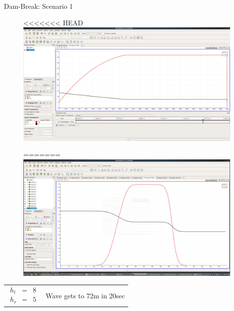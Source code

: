 \documentclass[shortpres]{beamer}
\newcommand{\imgvoffset}{-20pt}
\newcommand{\imgfullscale}{0.75}
\begin{document}
\begin{frame}{Dam-Break: Scenario 1}
	\begin{figure}[t]
		\vspace{\imgvoffset}
<<<<<<< HEAD
		\includegraphics[width=\imgfullscale\linewidth]{img/4_dorf_arrival_as_graph.png}
		\caption*{Scenario visualisation}
=======
		\includegraphics[width=\imgfullscale\linewidth]{img/Dam_hl8_hr5.png}
		\caption*{}
	\end{figure}
	
	\begin{tabular}{m{3cm} m{\linewidth-5cm}}
		$
		\begin{matrix}
		h_l & = & 8\\
		h_r & = & 5
		\end{matrix}
		$
		&
		
		Wave gets to 72m in 20sec
	\end{tabular}
\end{frame}
\end{document}
